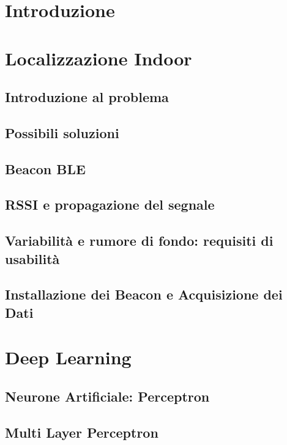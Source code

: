 \documentclass[12pt]{report}
\begin{document}
\begin{abstract}
  
\end{abstract}

\tableofcontents

\chapter{Introduzione}

\chapter{Localizzazione Indoor}
\section{Introduzione al problema}
\section{Possibili soluzioni}
\section{Beacon BLE}
\section{RSSI e propagazione del segnale}
\section{Variabilità e rumore di fondo: requisiti di usabilità}
\section{Installazione dei Beacon e Acquisizione dei Dati}

\chapter{Deep Learning}
\section{Neurone Artificiale: Perceptron}
\section{Multi Layer Perceptron}
\end{document}
